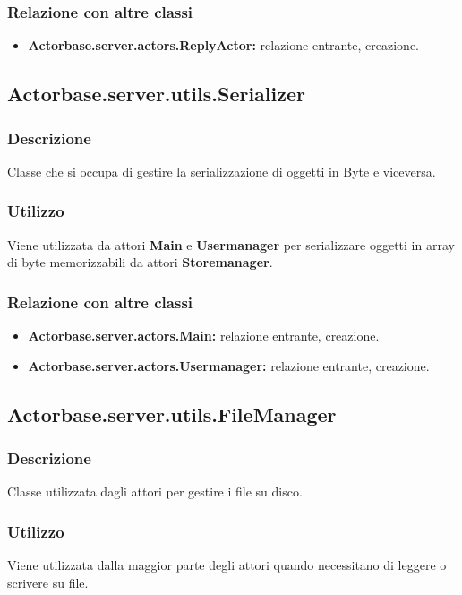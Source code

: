 \documentclass[a4paper]{article}
\begin{document}
			\subsubsection{Relazione con altre classi}
			\begin{itemize}
				\item \textbf{Actorbase.server.actors.ReplyActor:} relazione entrante, creazione.
			\end{itemize}
			
						\subsection{Actorbase.server.utils.Serializer}
			\subsubsection{Descrizione}
				Classe che si occupa di gestire la serializzazione di oggetti in Byte e viceversa.
				
			\subsubsection{Utilizzo}
				Viene utilizzata da attori \textbf{Main} e \textbf{Usermanager} per serializzare oggetti in array di byte memorizzabili da attori \textbf{Storemanager}.
				
			\subsubsection{Relazione con altre classi}
			\begin{itemize}
				\item \textbf{Actorbase.server.actors.Main:} relazione entrante, creazione.
				\item \textbf{Actorbase.server.actors.Usermanager:} relazione entrante, creazione.
			\end{itemize}
		
		\subsection{Actorbase.server.utils.FileManager}
			\subsubsection{Descrizione}
				Classe utilizzata dagli attori per gestire i file su disco.
				
			\subsubsection{Utilizzo}
				Viene utilizzata dalla maggior parte degli attori quando necessitano di leggere o scrivere su file.
				
\end{document}
